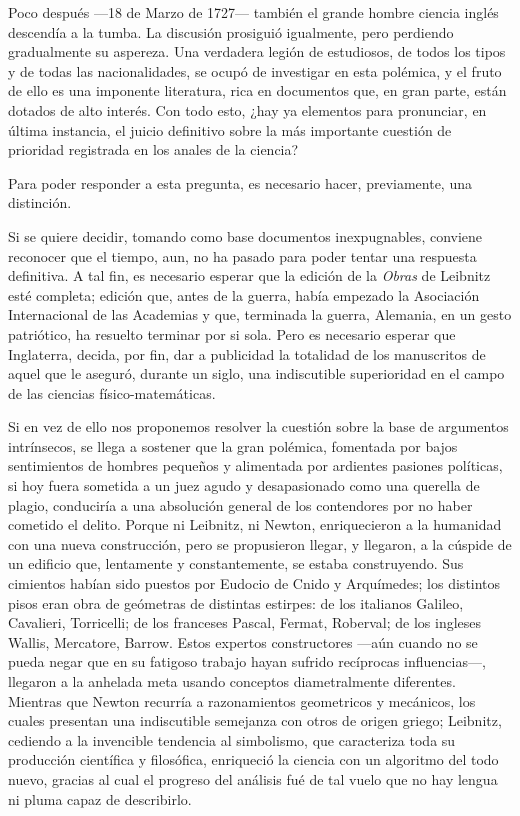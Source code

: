 \documentclass[a4paper, 12pt, draft]{article}
\begin{document}
{Poco después ---18 de Marzo de 1727--- también el grande hombre ciencia inglés descendía a la tumba. La discusión prosiguió igualmente, pero perdiendo gradualmente su aspereza. Una verdadera legión de estudiosos, de todos los tipos y de todas las nacionalidades, se ocupó de investigar en esta polémica, y el fruto de ello es una imponente literatura, rica en documentos que, en gran parte, están dotados de alto interés. Con todo esto, ¿hay ya elementos para pronunciar, en última instancia, el juicio definitivo sobre la más importante cuestión de prioridad registrada en los anales de la ciencia?

Para poder responder a esta pregunta, es necesario hacer, previamente, una distinción.

Si se quiere decidir, tomando como base documentos inexpugnables, conviene reconocer que el tiempo, aun, no ha pasado para poder tentar una respuesta definitiva. A tal fin, es necesario esperar que la edición de la \textit{ Obras} de Leibnitz esté completa;
edición que, antes de la guerra, había empezado
la Asociación Internacional de las Academias y que, terminada la guerra, Alemania, en un gesto patriótico, ha resuelto terminar por si sola. Pero es necesario esperar que Inglaterra, decida, por fin, dar a publicidad la totalidad de los manuscritos de aquel que le aseguró, durante un siglo, una indiscutible superioridad en el campo de las ciencias físico-matemáticas.

Si en vez de ello nos proponemos resolver la cuestión sobre la base de argumentos intrínsecos, se llega a sostener que la gran polémica, fomentada por bajos sentimientos de hombres pequeños y alimentada por ardientes pasiones políticas, si hoy fuera sometida a un juez agudo y desapasionado como una querella de plagio, conduciría a una absolución general de los contendores por no haber cometido el delito. Porque ni Leibnitz, ni Newton, enriquecieron a la humanidad con una nueva construcción, pero se propusieron llegar, y llegaron, a la cúspide de un edificio que, lentamente y constantemente, se estaba construyendo. Sus cimientos habían sido puestos por Eudocio de Cnido y Arquímedes; los distintos pisos eran obra de geómetras de distintas estirpes: de los italianos Galileo, Cavalieri, Torricelli; de los franceses Pascal, Fermat, Roberval; de los ingleses Wallis, Mercatore, Barrow. Estos expertos constructores ---aún cuando no se pueda negar que en su fatigoso trabajo hayan sufrido recíprocas influencias---, llegaron a la anhelada meta 
usando conceptos diametralmente diferentes. Mientras que Newton recurría a razonamientos geometricos y mecánicos, los cuales presentan una indiscutible semejanza con otros de origen griego; Leibnitz, cediendo a la invencible tendencia al simbolismo, que caracteriza toda su producción científica y filosófica, enriqueció la ciencia con un algoritmo del todo nuevo, gracias al cual el progreso del análisis fué de tal vuelo
que no hay lengua ni pluma capaz de describirlo.

}
\end{document}
